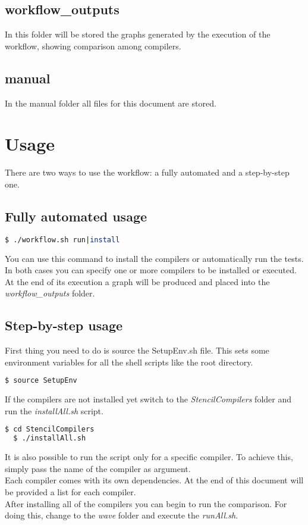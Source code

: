 \documentclass[AEJ]{AEA}
\begin{document}
\subsection{workflow\_outputs}
In this folder will be stored the graphs generated by the execution of the workflow, showing comparison among compilers.

\subsection{manual}
In the manual folder all files for this document are stored.

\section{Usage}
There are two ways to use the workflow: a fully automated and a step-by-step one.
\subsection{Fully automated usage}
\begin{lstlisting}[frame=single,language=bash]
  $ ./workflow.sh run|install
\end{lstlisting}

You can use this command to install the compilers or automatically run the tests. In both cases you can specify one or more compilers to be installed or executed. At the end of its execution a graph will be produced and placed into the  \emph{workflow\_outputs} folder.
\subsection{Step-by-step usage}
First thing you need to do is source the SetupEnv.sh file. This sets some environment variables for all the shell scripts like the root directory.

\begin{lstlisting}[frame=single,language=bash]
  $ source SetupEnv
\end{lstlisting}

If the compilers are not installed yet switch to the \emph{StencilCompilers} folder and run the \emph{installAll.sh} script. 
\begin{lstlisting}[frame=single,language=bash]
  $ cd StencilCompilers
  $ ./installAll.sh 
\end{lstlisting}

It is also possible to run the script only for a specific compiler. To achieve this, simply pass the name of the compiler as argument.
\\
Each compiler comes with its own dependencies. At the end of this document will be provided a list for each compiler. 
\\
After installing all of the compilers you can begin to run the comparison. For doing this, change to the\emph{ wave} folder and execute the \emph{runAll.sh}.
\end{document}
